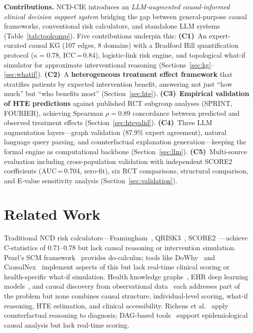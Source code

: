 \documentclass[runningheads]{llncs}
\begin{document}
\noindent\textbf{Contributions.}
NCD-CIE introduces an \emph{LLM-augmented causal-informed clinical
decision support system} bridging the gap between general-purpose causal
frameworks, conventional risk calculators, and standalone LLM systems
(Table~\ref{tab:toolcomp}).
Five contributions underpin this:
\textbf{(C1)}~An expert-curated causal KG (107 edges, 8 domains)
with a Bradford Hill quantification protocol ($\kappa=0.78$,
ICC\,=\,0.84), logistic-link risk engine, and topological what-if
simulator for approximate interventional reasoning
(Sections~\ref{sec:kg}--\ref{sec:whatif}).
\textbf{(C2)}~A \textbf{heterogeneous treatment effect framework}
that stratifies patients by expected intervention benefit, answering
not just ``how much'' but ``who benefits most''
(Section~\ref{sec:hte}).
\textbf{(C3)}~\textbf{Empirical validation of HTE predictions}
against published RCT subgroup analyses (SPRINT, FOURIER), achieving
Spearman $\rho = 0.89$ concordance between predicted and observed
treatment effects (Section~\ref{sec:htevalid}).
\textbf{(C4)}~Three LLM augmentation layers---graph validation
(87.9\% expert agreement), natural language query parsing, and
counterfactual explanation generation---keeping the formal engine
as computational backbone (Section~\ref{sec:llm}).
\textbf{(C5)}~Multi-source evaluation including cross-population
validation with independent SCORE2 coefficients
(AUC\,=\,0.704, zero-fit), six RCT comparisons,
structural comparison, and E-value sensitivity analysis
(Section~\ref{sec:validation}).

\section{Related Work}\label{sec:related}

Traditional NCD risk calculators---Framingham~\cite{dagostino2008},
QRISK3~\cite{hippisley2017qrisk3}, SCORE2~\cite{score22021}---achieve
C-statistics of 0.71--0.78 but lack causal reasoning or intervention
simulation.
Pearl's SCM framework~\cite{pearl2009causality,hernan2020causal}
provides do-calculus; tools like DoWhy~\cite{sharma2020dowhy} and
CausalNex~\cite{beaumont2021causalnex} implement aspects of this but
lack real-time clinical scoring or health-specific what-if simulation.
Health knowledge graphs~\cite{chandak2023primekg,barabasi2011network},
EHR deep learning models~\cite{li2020behrt,rasmy2021medbert}, and
causal discovery from observational data~\cite{prosperi2020causal}
each addresses part of the problem but none combines causal structure,
individual-level scoring, what-if reasoning, HTE estimation, and clinical
accessibility.
Richens et al.~\cite{richens2020causal} apply counterfactual
reasoning to diagnosis; DAG-based tools~\cite{textor2016dagitty}
support epidemiological causal analysis but lack real-time scoring.
\end{document}
